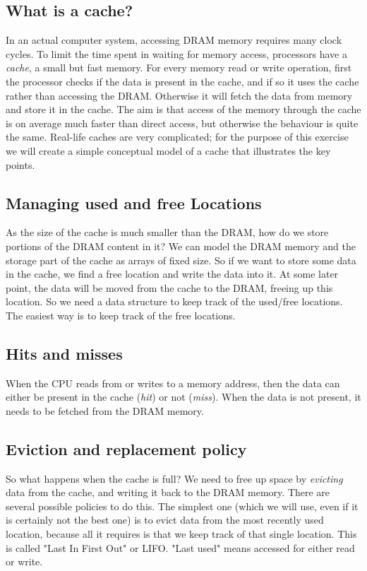 \documentclass[11pt]{article}
\begin{document}
 \subsection{What is a cache?}
 In an actual computer system, accessing DRAM memory requires many clock cycles. To limit the time spent in waiting for memory access, processors have a \emph{cache}, a small but fast memory. For every memory read or write operation, first the processor checks if the data is present in the cache, and if so it uses the cache rather than accessing the DRAM. Otherwise it will fetch the data from memory and store it in the cache. The aim is that access of the memory through the cache is on average much faster than direct access, but otherwise the behaviour is quite the same.  Real-life caches are very complicated; for the purpose of this exercise we will create a simple conceptual model of a cache that illustrates the key points.
 
 \subsection{Managing used and free Locations}
As the size of the  cache is  much smaller than the DRAM,  how do we store portions of the DRAM content in it? We can model the DRAM memory and the storage part of the cache as arrays of fixed size. So if we want to store some data in the cache, we find a free location and write the data into it. At some later point, the data will be moved from the cache to the DRAM, freeing up this location. So we need a data structure to keep track of the used/free locations.  The easiest way is to keep track of the free locations.

 \subsection{Hits and misses}
 
 When the CPU reads from or writes to a memory address, then the data can either be present in the cache (\emph{hit}) or not (\emph{miss}). When the data is not present, it needs to be fetched from the DRAM memory.
  
 \subsection{Eviction and replacement policy}
 
So what happens when the cache is full? We need to free up space by \emph{evicting} data from the cache, and writing it back to the DRAM memory. There are several possible policies to do this. The simplest one (which we will use, even if it is certainly not the best one) is to evict data from the most recently used location, because all it requires is that we keep track of that single location. This is called "Last In First Out" or LIFO.  "Last used" means accessed for either read or write.
\end{document}
